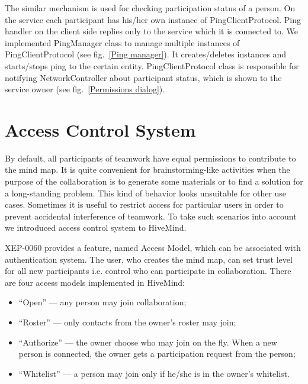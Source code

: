 The similar mechanism is used for checking participation status of a person. On
the service each participant has his/her own instance of PingClientProtocol. Ping
handler on the client side replies only to the service which it is connected
to. We implemented PingManager class to manage multiple instances of
PingClientProtocol (see fig.~\ref{Ping manager}).  It creates/deletes instances
and starts/stops ping to the certain entity. PingClientProtocol class is
responsible for notifying NetworkController about participant status, which is
shown to the service owner (see fig.~\ref{Permissions dialog}).

\section{Access Control System}
\label{Access control system}

By default, all participants of teamwork have equal permissions to contribute to
the mind map. It is quite convenient for brainstorming-like activities when the
purpose of the collaboration is to generate some materials or to find a solution
for a long-standing problem. This kind of behavior looks unsuitable for other
use cases. Sometimes it is useful to restrict access for particular users in
order to prevent accidental interference of teamwork. To take such scenarios
into account we introduced access control system to HiveMind.

XEP-0060 provides a feature, named Access Model, which can be associated with
authentication system. The user, who creates the mind map, can set trust level
for all new participants i.e. control who can participate in collaboration.
There are four access models implemented in HiveMind:
\begin{itemize}
\item ``Open'' --- any person may join collaboration;
\item ``Roster'' --- only contacts from the owner’s roster may join;
\item ``Authorize'' --- the owner choose who may join on the fly. When a new
  person is connected, the owner gets a participation request from the person;
\item ``Whitelist'' --- a person may join only if he/she is in the owner’s
  whitelist.
\end{itemize}

